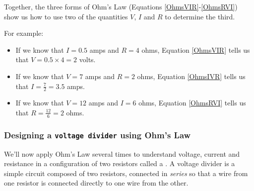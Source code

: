 
Together, the three forms of Ohm's Law (Equations \ref{OhmsVIR}-\ref{OhmsRVI}) show us how to use two of the quantities $V$, $I$ and $R$ to determine the third.

For example:
\begin{itemize}
	\item  If we know that $I=0.5$ amps and $R=4$ ohms, Equation \ref{OhmsVIR} tells us that $V=0.5 \times 4 = 2$ volts.
	\item  If we know that $V=7$ amps and $R=2$ ohms, Equation \ref{OhmsIVR} tells us that $I= \frac{7}{2} = 3.5$ amps.
	\item  If we know that $V=12$ amps and $I=6$ ohms, Equation \ref{OhmsRVI} tells us that $R= \frac{12}{6} = 2$ ohms.
\end{itemize}

\subsubsection{Designing a \texttt{voltage divider} using Ohm's Law}
We'll now apply Ohm's Law several times to understand voltage, current and resistance in a configuration of two resistors called a .
A voltage divider is a simple circuit composed of two resistors, connected in \emph{series} so that a wire from one resistor is connected directly to one wire from the other.

